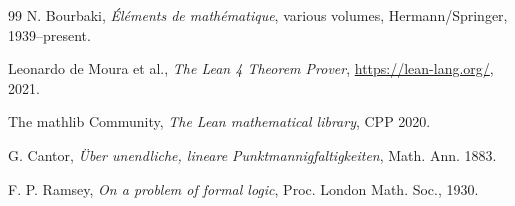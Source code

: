\documentclass[a4paper,12pt]{ltjsarticle}
\theoremstyle{definition}
\begin{document}
\begin{thebibliography}{99}
N. Bourbaki, \textit{Éléments de mathématique}, various volumes, Hermann/Springer, 1939--present.

Leonardo de Moura et al., \textit{The Lean 4 Theorem Prover}, \url{https://lean-lang.org/}, 2021.

The mathlib Community, \textit{The Lean mathematical library}, CPP 2020.

G. Cantor, \textit{Über unendliche, lineare Punktmannigfaltigkeiten}, Math. Ann. 1883.

F. P. Ramsey, \textit{On a problem of formal logic}, Proc. London Math. Soc., 1930.

\end{thebibliography}
\end{document}
